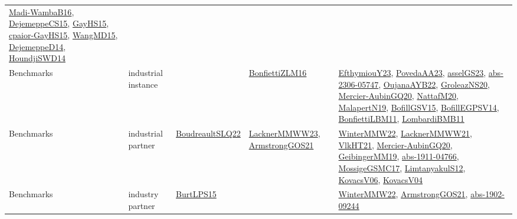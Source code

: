 {\begin{longtable}{llp{6cm}p{6cm}p{6cm}}
\href{papers/Madi-WambaB16.pdf}{Madi-WambaB16}\cite{Madi-WambaB16}, \href{papers/DejemeppeCS15.pdf}{DejemeppeCS15}\cite{DejemeppeCS15}, \href{papers/GayHS15.pdf}{GayHS15}\cite{GayHS15}, \href{papers/cpaior-GayHS15.pdf}{cpaior-GayHS15}\cite{cpaior-GayHS15}, \href{articles/WangMD15.pdf}{WangMD15}\cite{WangMD15}, \href{papers/DejemeppeD14.pdf}{DejemeppeD14}\cite{DejemeppeD14}, \href{papers/HoundjiSWD14.pdf}{HoundjiSWD14}\cite{HoundjiSWD14}\\
Benchmarks & industrial instance &  & \href{papers/BonfiettiZLM16.pdf}{BonfiettiZLM16}\cite{BonfiettiZLM16} & \href{papers/EfthymiouY23.pdf}{EfthymiouY23}\cite{EfthymiouY23}, \href{papers/PovedaAA23.pdf}{PovedaAA23}\cite{PovedaAA23}, \href{papers/asselGS23.pdf}{asselGS23}\cite{asselGS23}, \href{articles/abs-2306-05747.pdf}{abs-2306-05747}\cite{abs-2306-05747}, \href{papers/OujanaAYB22.pdf}{OujanaAYB22}\cite{OujanaAYB22}, \href{papers/GroleazNS20.pdf}{GroleazNS20}\cite{GroleazNS20}, \href{papers/Mercier-AubinGQ20.pdf}{Mercier-AubinGQ20}\cite{Mercier-AubinGQ20}, \href{papers/NattafM20.pdf}{NattafM20}\cite{NattafM20}, \href{papers/MalapertN19.pdf}{MalapertN19}\cite{MalapertN19}, \href{papers/BofillGSV15.pdf}{BofillGSV15}\cite{BofillGSV15}, \href{papers/BofillEGPSV14.pdf}{BofillEGPSV14}\cite{BofillEGPSV14}, \href{papers/BonfiettiLBM11.pdf}{BonfiettiLBM11}\cite{BonfiettiLBM11}, \href{papers/LombardiBMB11.pdf}{LombardiBMB11}\cite{LombardiBMB11}\\
Benchmarks & industrial partner & \href{papers/BoudreaultSLQ22.pdf}{BoudreaultSLQ22}\cite{BoudreaultSLQ22} & \href{articles/LacknerMMWW23.pdf}{LacknerMMWW23}\cite{LacknerMMWW23}, \href{papers/ArmstrongGOS21.pdf}{ArmstrongGOS21}\cite{ArmstrongGOS21} & \href{papers/WinterMMW22.pdf}{WinterMMW22}\cite{WinterMMW22}, \href{papers/LacknerMMWW21.pdf}{LacknerMMWW21}\cite{LacknerMMWW21}, \href{articles/VlkHT21.pdf}{VlkHT21}\cite{VlkHT21}, \href{papers/Mercier-AubinGQ20.pdf}{Mercier-AubinGQ20}\cite{Mercier-AubinGQ20}, \href{papers/GeibingerMM19.pdf}{GeibingerMM19}\cite{GeibingerMM19}, \href{articles/abs-1911-04766.pdf}{abs-1911-04766}\cite{abs-1911-04766}, \href{papers/MossigeGSMC17.pdf}{MossigeGSMC17}\cite{MossigeGSMC17}, \href{articles/LimtanyakulS12.pdf}{LimtanyakulS12}\cite{LimtanyakulS12}, \href{papers/KovacsV06.pdf}{KovacsV06}\cite{KovacsV06}, \href{papers/KovacsV04.pdf}{KovacsV04}\cite{KovacsV04}\\
Benchmarks & industry partner & \href{papers/BurtLPS15.pdf}{BurtLPS15}\cite{BurtLPS15} &  & \href{papers/WinterMMW22.pdf}{WinterMMW22}\cite{WinterMMW22}, \href{papers/ArmstrongGOS21.pdf}{ArmstrongGOS21}\cite{ArmstrongGOS21}, \href{articles/abs-1902-09244.pdf}{abs-1902-09244}\cite{abs-1902-09244}\\

\end{longtable}}
